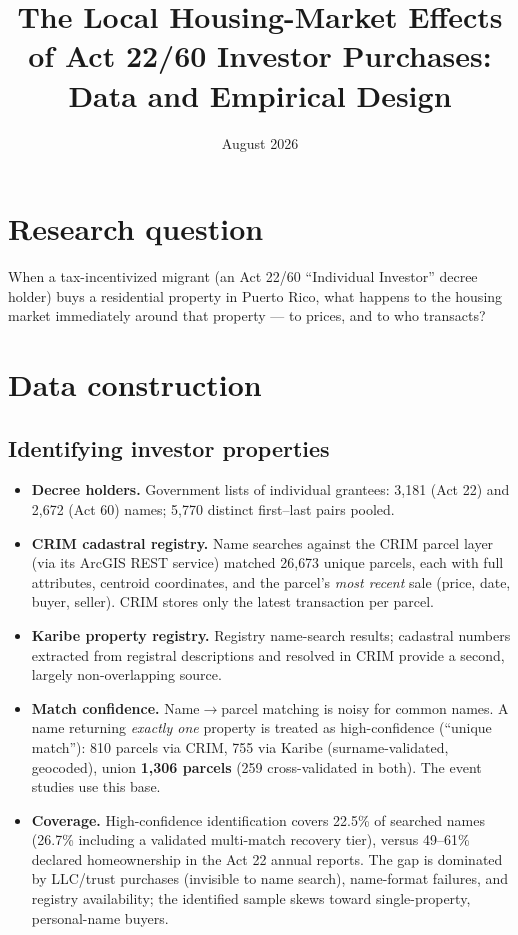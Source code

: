\documentclass[11pt]{article}
\title{The Local Housing-Market Effects of Act 22/60 Investor Purchases:\\
Data and Empirical Design}
\author{}
\date{August 2026}
\begin{document}
\maketitle
\onehalfspacing

\section{Research question}

When a tax-incentivized migrant (an Act 22/60 ``Individual Investor'' decree
holder) buys a residential property in Puerto Rico, what happens to the housing
market immediately around that property --- to prices, and to who transacts?

\section{Data construction}

\subsection{Identifying investor properties}

\begin{itemize}[leftmargin=*]
  \item \textbf{Decree holders.} Government lists of individual grantees:
  3{,}181 (Act 22) and 2{,}672 (Act 60) names; 5{,}770 distinct first--last
  pairs pooled.
  \item \textbf{CRIM cadastral registry.} Name searches against the CRIM parcel
  layer (via its ArcGIS REST service) matched 26{,}673 unique parcels, each with
  full attributes, centroid coordinates, and the parcel's \emph{most recent}
  sale (price, date, buyer, seller). CRIM stores only the latest transaction
  per parcel.
  \item \textbf{Karibe property registry.} Registry name-search results;
  cadastral numbers extracted from registral descriptions and resolved in CRIM
  provide a second, largely non-overlapping source.
  \item \textbf{Match confidence.} Name$\to$parcel matching is noisy for common
  names. A name returning \emph{exactly one} property is treated as
  high-confidence (``unique match''): 810 parcels via CRIM, 755 via Karibe
  (surname-validated, geocoded), union \textbf{1{,}306 parcels} (259
  cross-validated in both). The event studies use this base.
  \item \textbf{Coverage.} High-confidence identification covers 22.5\% of
  searched names (26.7\% including a validated multi-match recovery tier),
  versus 49--61\% declared homeownership in the Act 22 annual reports. The gap
  is dominated by LLC/trust purchases (invisible to name search), name-format
  failures, and registry availability; the identified sample skews toward
  single-property, personal-name buyers.
\end{itemize}
\end{document}
